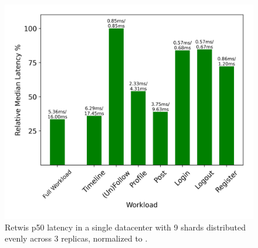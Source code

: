 
\begin{figure}[tbp]
\centering
  \includegraphics[width=.9\linewidth]{figs/retwis/relative_latencies_retwis.png}
\caption{Retwis p50 latency in a single datacenter  with 9 shards distributed evenly across 3 replicas, normalized to \mpaxos{}.}
\label{fig:retwis}
\end{figure}

